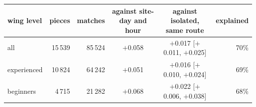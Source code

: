 \begin{tabular}{@{}l r r c c r@{}}
\toprule
wing level & pieces & matches & against site-day and hour & against isolated, same route & explained \\
\midrule
all & 15\,539 & 85\,524 & $+$0.058 & $+$0.017 [$+$0.011, $+$0.025] & 70\% \\
experienced & 10\,824 & 64\,242 & $+$0.051 & $+$0.016 [$+$0.010, $+$0.024] & 69\% \\
beginners & 4\,715 & 21\,282 & $+$0.068 & $+$0.022 [$+$0.006, $+$0.038] & 68\% \\
\bottomrule
\end{tabular}
